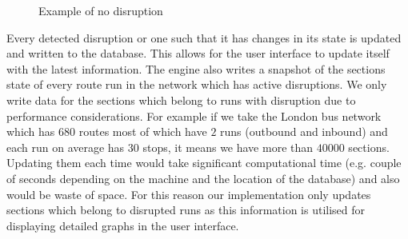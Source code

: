 \begin{figure}[ht]
	\caption{Example of no disruption}
	\label{fig:example2}
\end{figure}

Every detected disruption or one such that it has changes in its state is updated and written to the database. This allows for the user interface to update itself with the latest information. The engine also writes a snapshot of the sections state of every route run in the network which has active disruptions. We only write data for the sections which belong to runs with disruption due to performance considerations. For example if we take the London bus network which has $680$ routes most of which have $2$ runs (outbound and inbound) and each run on average has $30$ stops, it means we have more than $40000$ sections. Updating them each time would take significant computational time (e.g. couple of seconds depending on the machine and the location of the database) and also would be waste of space. For this reason our implementation only updates sections which belong to disrupted runs as this information is utilised for displaying detailed graphs in the user interface.


